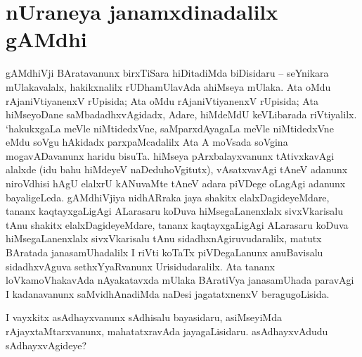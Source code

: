 \makeatletter
\def\@makechapterhead#1{%
  \vspace*{10\p@}%
{\fontsize{13pt}{13pt}\selectfont\raggedright{\bf  kArflx jAsapxrf}\par}
\vspace*{25\p@}%
  {\parindent \z@ \centering \normalfont
    \ifnum \c@secnumdepth >\m@ne
      \if@mainmatter
        {\LARGE\bfseries  #1}\par\nobreak
	\vskip 4pt
      \fi
    \fi
\smallskip 

 \vskip 10\p@  
{\fontsize{12pt}{12pt}\selectfont\raggedleft{anu: \bf pu.ti.na.}\par}
  }
\vskip 40\p@}
\makeatother


\chapter{nUraneya janamxdinadalilx gAMdhi}\label{chap1}


gAMdhiVji BAratavanunx birxTiSara hiDitadiMda biDisidaru -- seYnikara mUlakavalalx, hakikxnalilx rUDhamUlavAda ahiMseya mUlaka. Ata oMdu rAjaniVtiyanenxV rUpisida; Ata oMdu rAjaniVtiyanenxV rUpisida; Ata hiMseyoDane saMbadadhxvAgidadx, Adare, hiMdeMdU keVLibarada riVtiyalilx. `hakukxgaLa meVle niMtidedxVne, saMparxdAyagaLa meVle niMtidedxVne eMdu soVgu hAkidadx parxpaMcadalilx Ata A moVsada soVgina mogavADavanunx haridu bisuTa. hiMseya pArxbalayxvanunx tAtivxkavAgi alalxde (idu bahu hiMdeyeV naDeduhoVgitutx), vAsatxvavAgi tAneV adanunx niroVdhisi hAgU elalxrU kANuvaMte tAneV adara piVDege oLagAgi adanunx bayaligeLeda. gAMdhiVjiya nidhARraka jaya shakitx elalxDagideyeMdare, tananx kaqtayxgaLigAgi ALarasaru koDuva hiMsegaLanenxlalx sivxVkarisalu tAnu shakitx elalxDagideyeMdare, tananx kaqtayxgaLigAgi ALarasaru koDuva hiMsegaLanenxlalx sivxVkarisalu tAnu sidadhxnAgiruvudaralilx, matutx BAratada janasamUhadalilx I riVti koTaTx piVDegaLanunx anuBavisalu sidadhxvAguva sethxYyaRvanunx Urisidudaralilx. Ata tananx loVkamoVhakavAda nAyakatavxda mUlaka BAratiVya janasamUhada paravAgi I kadanavanunx saMvidhAnadiMda naDesi jagatatxnenxV beragugoLisida.

I vayxkitx asAdhayxvanunx sAdhisalu bayasidaru, asiMseyiMda rAjayxtaMtarxvanunx, mahatatxravAda jayagaLisidaru. asAdhayxvAdudu sAdhayxvAgideye?

